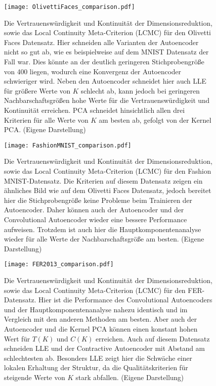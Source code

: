 \begin{figure}[ht]
	\begin{center}
		\texttt{[image: OlivettiFaces\_comparison.pdf]}
	\end{center}
	\caption[Qualitätskriterien für den Olivetti Faces-Datensatz]{Die Vertrauenswürdigkeit und Kontinuität der Dimensionsreduktion, sowie das Local Continuity Meta-Criterion (LCMC) für den Olivetti Faces Datensatz. Hier schneiden alle Varianten der Autoencoder nicht so gut ab, wie es beispielweise auf dem MNIST Datensatz der Fall war. Dies könnte an der deutlich geringeren Stichprobengröße von 400 liegen, wodurch eine Konvergenz der Autoencoder schwieriger wird. Neben den Autoencoder schneidet hier auch LLE für größere Werte von $K$ schlecht ab, kann jedoch bei geringeren Nachbarschaftsgrößen hohe Werte für die Vertrauenswürdigkeit und Kontinuität erreichen. PCA schneidet hinsichtlich allen drei Kriterien für alle Werte von $K$ am besten ab, gefolgt von der Kernel PCA. (Eigene Darstellung)}
	\label{fig:OlivettiFacesMetrics}
\end{figure}

\begin{figure}[ht]
	\begin{center}
		\texttt{[image: FashionMNIST\_comparison.pdf]}
	\end{center}
	\caption[Qualitätskriterien für den Fashion MNIST-Datensatz]{Die Vertrauenswürdigkeit und Kontinuität der Dimensionsreduktion, sowie das Local Continuity Meta-Criterion (LCMC) für den Fashion MNIST-Datensatz. Die Kriterien auf diesem Datensatz zeigen ein ähnliches Bild wie auf dem Olivetti Faces Datensatz, jedoch bereitet hier die Stichprobengröße keine Probleme beim Trainieren der Autoencoder. Daher können auch der Autoencoder und der Convolutional Autoencoder wieder eine bessere Performance aufweisen. Trotzdem ist auch hier die Hauptkomponentenanalyse wieder für alle Werte der Nachbarschaftsgröße am besten. (Eigene Darstellung)}
	\label{fig:FashionMNISTMetrics}
\end{figure}

\begin{figure}[ht]
	\begin{center}
		\texttt{[image: FER2013\_comparison.pdf]}
	\end{center}
	\caption[Qualitätskriterien für den FER-Datensatz]{Die Vertrauenswürdigkeit und Kontinuität der Dimensionsreduktion, sowie das Local Continuity Meta-Criterion (LCMC) für den FER-Datensatz. Hier ist die Performance des Convolutional Autoencoders und der Hauptkomponentenanalyse nahezu identisch und im Vergleich mit den anderen Methoden am besten. Aber auch der Autoencoder und die Kernel PCA können einen konstant hohen Wert für $T(K)$ und $C(K)$ erreichen. Auch auf diesem Datensatz schneiden LLE und der Contractive Autoencoder mit Abstand am schlechtesten ab. Besonders LLE zeigt hier die Schwäche einer lokalen Erhaltung der Struktur, da die Qualitätskriterien für steigende Werte von $K$ stark abfallen. (Eigene Darstellung)}
	\label{fig:FER2013Metrics}
\end{figure}

